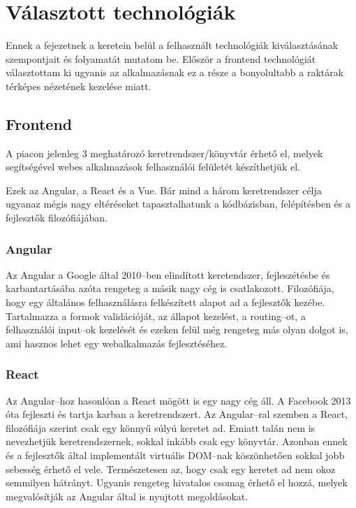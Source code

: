 \chapter{Választott technológiák}

Ennek a fejezetnek a keretein belül a felhasznált technológiák kiválasztásának szempontjait és folyamatát mutatom be. 
Először a frontend technológiát választottam ki ugyanis az alkalmazásnak ez a része a bonyolultabb a raktárak térképes nézetének kezelése miatt.

\section{Frontend}

A piacon jelenleg 3 meghatározó keretrendszer/könyvtár érhető el, melyek segítségével webes alkalmazások felhasználói felületét készíthetjük el.

Ezek az Angular, a React és a Vue. 
Bár mind a három keretrendszer célja ugyanaz mégis nagy eltéréseket tapasztalhatunk a kódbázisban, felépítésben és a fejlesztők filozófiájában.

\subsection{Angular}

Az Angular a Google által 2010–ben elindított keretendszer, fejleszétésbe és karbantartásába azóta rengeteg  a másik nagy cég is csatlakozott\cite{Angular}.
Filozófiája, hogy egy általános felhasználásra felkészített alapot ad a fejlesztők kezébe.
Tartalmazza a formok validációját, az állapot kezelést, a routing–ot, a felhasználói input–ok kezelését és ezeken felül még rengeteg más olyan dolgot is, ami hasznos lehet egy webalkalmazás fejlesztéséhez.

\subsection{React}

Az Angular–hoz hasonlóan a React mögött is egy nagy cég áll.
A Facebook 2013 óta fejleszti és tartja karban a keretrendszert\cite{React}.
Az Angular–ral szemben a React, filozófiája szerint csak egy könnyű súlyú keretet ad. 
Emiatt talán nem is nevezhetjük keretrendszernek, sokkal inkább csak egy könyvtár. 
Azonban ennek és a fejlesztők által implementált virtuális DOM–nak köszönhetően sokkal jobb sebesség érhető el vele.
Természetesen az, hogy csak egy keretet ad nem okoz semmilyen hátrányt.
Ugyanis rengeteg hivatalos csomag érhető el hozzá, melyek megvalósítják az Angular által is nyujtott megoldásokat.

